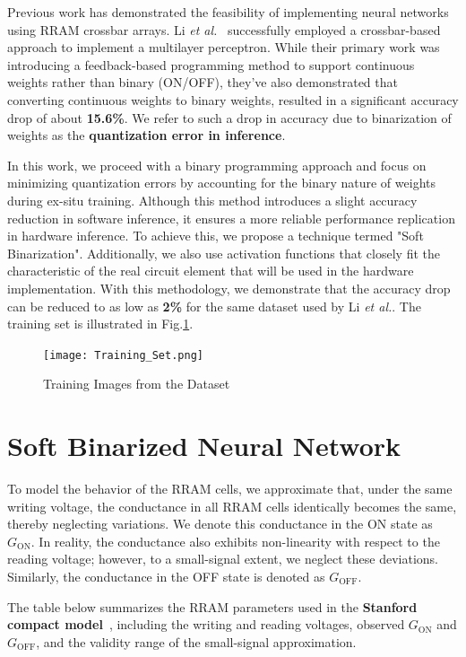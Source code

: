 \documentclass[conference]{IEEEtran}  %
\begin{document}
Previous work has demonstrated the feasibility of implementing neural networks using RRAM crossbar arrays. Li \textit{et al.}~\cite{b1} successfully employed a crossbar-based approach to implement a multilayer perceptron. While their primary work was introducing a feedback-based programming method to support continuous weights rather than binary (ON/OFF), they've also demonstrated that converting continuous weights to binary weights, resulted in a significant accuracy drop of about \textbf{15.6\%}. We refer to such a drop in accuracy due to binarization of weights as the \textbf{quantization error in inference}.

In this work, we proceed with a binary programming approach and focus on minimizing quantization errors by accounting for the binary nature of weights during ex-situ training. Although this method introduces a slight accuracy reduction in software inference, it ensures a more reliable performance replication in hardware inference. To achieve this, we propose a technique termed "Soft Binarization". Additionally, we also use activation functions that closely fit the characteristic of the real circuit element that will be used in the hardware implementation. With this methodology, we demonstrate that the accuracy drop can be reduced to as low as \textbf{2\%} for the same dataset used by Li \textit{et al.}\cite{b1}. The training set is illustrated in Fig.\ref{fig:1}.


\begin{figure}[h]
    \centering
    \texttt{[image: Training\_Set.png]}
    \caption{Training Images from the Dataset}
    \label{fig:1}
\end{figure}
\vspace*{-3mm}
\section{Soft Binarized Neural Network} 

To model the behavior of the RRAM cells, we approximate that, under the same writing voltage, the conductance in all RRAM cells identically becomes the same, thereby neglecting variations. We denote this conductance in the ON state as \( G_{\text{ON}} \). In reality, the conductance also exhibits non-linearity with respect to the reading voltage; however, to a small-signal extent, we neglect these deviations. Similarly, the conductance in the OFF state is denoted as \( G_{\text{OFF}} \). 

The table below summarizes the RRAM parameters used in the \textbf{Stanford compact model}~\cite{b2}, including the writing and reading voltages, observed \( G_{\text{ON}} \) and \( G_{\text{OFF}} \), and the validity range of the small-signal approximation.
\end{document}
